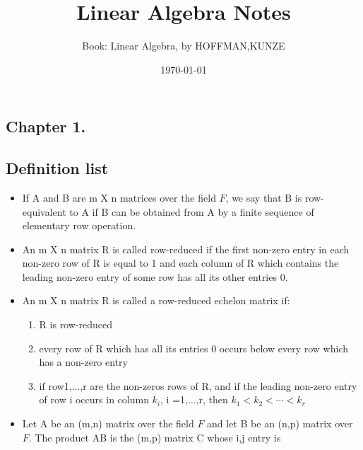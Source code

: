 \documentclass[12pt, a4paper]{article}
\title{\textbf{Linear Algebra Notes}}
\author{Book: Linear Algebra, by HOFFMAN,KUNZE}
\date{\today}
\begin{document}
\begin{CJK*}{UTF8}{bsmi}
\linespread{1.5}
\maketitle
\newcommand{\st}[1]{\section*{#1}}
\newcommand{\sst}[1]{\subsection*{#1}}
\newcommand{\ssst}[1]{\subsubsection*{#1}}
\newcommand{\dsp}{\displaystyle}
\newcommand{\dx}{\,dx}
\newcommand{\dphi}{\,d\phi}
\newcommand{\dtheta}{\,d\theta}
\newcommand{\dy}{\,dy}
\newcommand{\dz}{\,dz}
\newcommand{\dr}{\,dr}
\newcommand{\drho}{\,d\rho}
\newcommand{\tb}{\textbf}
\newcommand{\scr}{\mathscr}
\st{Chapter 1.}
\sst{Definition list}
\begin{itemize}
    \item If A and B are m X n matrices over the field \(F\), we say that B is row-equivalent to A if B can be obtained from A by a finite sequence of elementary row operation.
    \item An m X n matrix R is called row-reduced if the first non-zero entry in each non-zero row of R is equal to 1 and each column of R which contains the leading non-zero entry of some row has all its other entries 0.
    \item An m X n matrix R is called a row-reduced echelon matrix if:\begin{enumerate}
        \item R is row-reduced
        \item every row of R which has all its entries 0 occurs below every row which has a non-zero entry
        \item if row1,\(\ldots\),r are the non-zeros rows of R, and if the leading non-zero entry of row i occurs in column \(k_i\), i =1,\(\ldots\),r, then \(k_1<k_2<\cdots<k_r\)
    \end{enumerate}
    \item Let A be an (m,n) matrix over the field \(F\) and let B be an (n,p) matrix over \(F\). The product AB is the (m,p) matrix C whose i,j entry is\begin{equation}

\end{equation}
\end{itemize}
\end{CJK*}
\end{document}
